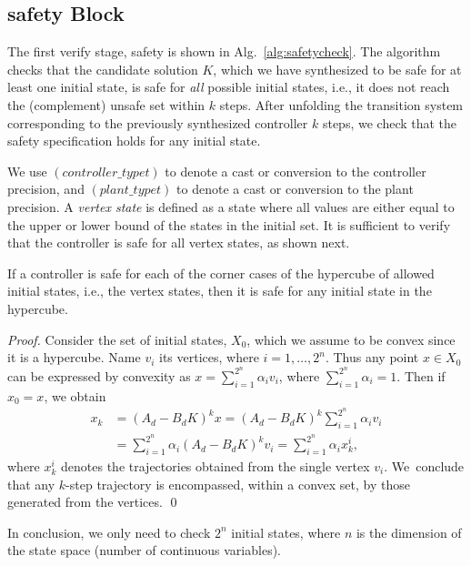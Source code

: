 \subsection{{\sc safety} Block}

The first {\sc verify} stage, {\sc safety} is shown in Alg.~\ref{alg:safetycheck}. 
The algorithm checks that the candidate
solution $K$, which we have synthesized to be safe for at least one initial
state, is safe for \emph{all} possible initial states, i.e., it does not reach
the (complement) unsafe set within $k$ steps.  After unfolding the transition system corresponding
to the previously synthesized controller $k$ steps, we check that the safety
specification holds for any initial state. 

We use $(controller\_typet)$ to denote a
cast or conversion to the controller precision, and $(plant\_typet)$ to denote a cast or conversion to the 
plant precision. A \emph{vertex state} is defined as a state where all values are either equal to the upper or lower
bound of the states in the initial set. It is sufficient to verify that the controller is safe for all vertex states, as shown next.  


\begin{theorem}
  \label{th:safety}
If a controller is safe for each of the corner cases of the hypercube of allowed initial states, 
i.e., the vertex states, then it is safe for any initial state in the hypercube. 
\end{theorem}
\begin{proof}
Consider the set of initial states, $X_0$, which we assume to be convex since it is a hypercube. 
Name $v_i$ its vertices, where $i=1,\ldots, 2^n$.  
Thus any point $x \in X_0$ can be expressed by convexity as $x = \sum_{i=1}^{2^n} \alpha_i v_i$, 
where $\sum_{i=1}^{2^n} \alpha_i =1$. Then if $x_0=x$, we obtain 
\begin{align*}
x_k   &= (A_d - B_d K)^k x = (A_d - B_d K)^k \sum_{i=1}^{2^n} \alpha_i v_i \\
      &= \sum_{i=1}^{2^n} \alpha_i (A_d - B_d K)^k v_i = \sum_{i=1}^{2^n} \alpha_i x_k^i, 
 \end{align*}     
%
where $x_k^i$ denotes the trajectories obtained from the single vertex
$v_i$.  We~conclude that any $k$-step trajectory is encompassed, within a
convex set, by those generated from the vertices. 
\qed
\end{proof}
In conclusion, we only need to check $2^n$ initial states, 
where $n$ is the dimension of the state space (number of continuous variables).

